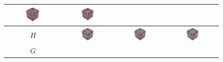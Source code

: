 \documentclass[runningheads]{llncs}
\begin{document}
\begin{figure}
\begin{center}
\begin{tabular}{|c||c|c|c|}
          \includegraphics[width=0.3\textwidth]{pictures/d20-k2-CTriv}&
          \includegraphics[width=0.3\textwidth]{pictures/d20-k2-NV}\\ \hline
          $H$&
          \includegraphics[width=0.3\textwidth]{pictures/d20-H-II}&
          \includegraphics[width=0.3\textwidth]{pictures/d20-H-CTriv}&
          \includegraphics[width=0.3\textwidth]{pictures/d20-H-NV}\\ \hline
          $G$&

\end{tabular}
\end{center}
\end{figure}
\end{document}
